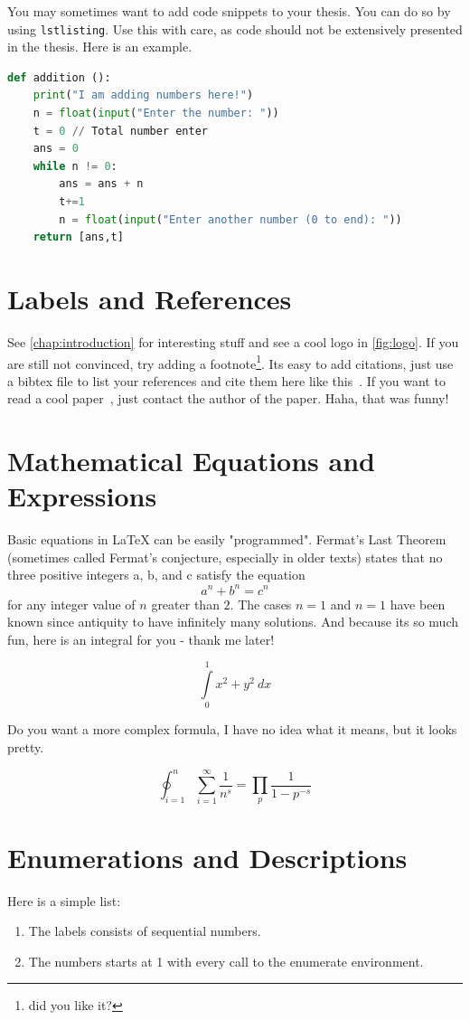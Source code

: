 \documentclass{imc-inf}
\begin{document}
You may sometimes want to add code snippets to your thesis. You can do so by using \texttt{lstlisting}. Use this with care, as code should not be extensively presented in the thesis. Here is an example. 

\begin{lstlisting}[language=Python]
def addition ():
    print("I am adding numbers here!")
    n = float(input("Enter the number: "))
    t = 0 // Total number enter
    ans = 0
    while n != 0:
        ans = ans + n
        t+=1
        n = float(input("Enter another number (0 to end): "))
    return [ans,t]
\end{lstlisting}

\section{Labels and References}
See \autoref{chap:introduction} for interesting stuff and see a cool logo in \autoref{fig:logo}. If you are still not convinced, try adding a footnote\footnote{did you like it?}. Its easy to add citations, just use a bibtex file to list your references and cite them here like this~\cite{988366}. If you want to read a cool paper~\cite{DBLP:conf/euromicro/DhunganaHW20}, just contact the author of the paper. Haha, that was funny! 




\section{Mathematical Equations and Expressions}
Basic equations in  \LaTeX{} can be easily "programmed". Fermat's Last Theorem (sometimes called Fermat's conjecture, especially in older texts) states that no three positive integers a, b, and c satisfy the equation \[ a^n + b^n = c^n \] for any integer value of $n$ greater than $2$. The cases $n = 1$ and  $n = 1$  have been known since antiquity to have infinitely many solutions. And because its so much fun, here is an integral for you - thank me later!  

\[ \int\limits_0^1 x^2 + y^2 \ dx \]

Do you want a more complex formula, I have no idea what it means, but it looks pretty. 

\[\oint_{i=1}^n \sum_{i=1}^{\infty} \frac{1}{n^s} 
= \prod_p \frac{1}{1 - p^{-s}} \]


\section{Enumerations and Descriptions}
Here is a simple list: 
\begin{enumerate}
	\item The labels consists of sequential numbers.
	\item The numbers starts at 1 with every call to the enumerate environment.
\end{enumerate}
\end{document}
